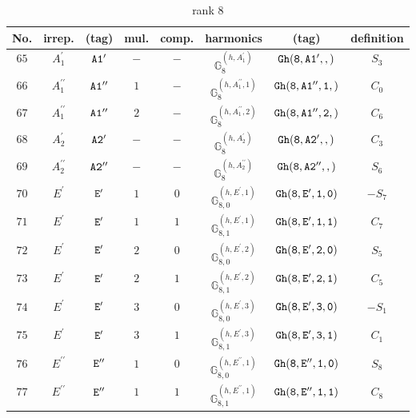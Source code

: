 \documentclass[fleqn,8pt]{jsarticle}
\begin{document}
\begin{table}[ht!]
\begin{center}
\caption{rank 8}
\renewcommand{\arraystretch}{1.3}
\begin{tabular}{cccccccc} \hline \hline
No. & irrep. & (tag) & mul. & comp. & harmonics & (tag) & definition \\ \hline
$ 65 $ & $ A_{1}^{\prime} $ & $ {\tt A1'} $ & $ - $ & $ - $ & $ \mathbb{G}_{8}^{(h,A_{1}^{\prime})} $ & $ {\tt Gh(8,A1',,)} $ & $ S_{3} $ \\
$ 66 $ & $ A_{1}^{\prime\prime} $ & $ {\tt A1''} $ & $ 1 $ & $ - $ & $ \mathbb{G}_{8}^{(h,A_{1}^{\prime\prime},1)} $ & $ {\tt Gh(8,A1'',1,)} $ & $ C_{0} $ \\
$ 67 $ & $ A_{1}^{\prime\prime} $ & $ {\tt A1''} $ & $ 2 $ & $ - $ & $ \mathbb{G}_{8}^{(h,A_{1}^{\prime\prime},2)} $ & $ {\tt Gh(8,A1'',2,)} $ & $ C_{6} $ \\
$ 68 $ & $ A_{2}^{\prime} $ & $ {\tt A2'} $ & $ - $ & $ - $ & $ \mathbb{G}_{8}^{(h,A_{2}^{\prime})} $ & $ {\tt Gh(8,A2',,)} $ & $ C_{3} $ \\
$ 69 $ & $ A_{2}^{\prime\prime} $ & $ {\tt A2''} $ & $ - $ & $ - $ & $ \mathbb{G}_{8}^{(h,A_{2}^{\prime\prime})} $ & $ {\tt Gh(8,A2'',,)} $ & $ S_{6} $ \\
$ 70 $ & $ E^{\prime} $ & $ {\tt E'} $ & $ 1 $ & $ 0 $ & $ \mathbb{G}_{8,0}^{(h,E^{\prime},1)} $ & $ {\tt Gh(8,E',1,0)} $ & $ - S_{7} $ \\
$ 71 $ & $ E^{\prime} $ & $ {\tt E'} $ & $ 1 $ & $ 1 $ & $ \mathbb{G}_{8,1}^{(h,E^{\prime},1)} $ & $ {\tt Gh(8,E',1,1)} $ & $ C_{7} $ \\
$ 72 $ & $ E^{\prime} $ & $ {\tt E'} $ & $ 2 $ & $ 0 $ & $ \mathbb{G}_{8,0}^{(h,E^{\prime},2)} $ & $ {\tt Gh(8,E',2,0)} $ & $ S_{5} $ \\
$ 73 $ & $ E^{\prime} $ & $ {\tt E'} $ & $ 2 $ & $ 1 $ & $ \mathbb{G}_{8,1}^{(h,E^{\prime},2)} $ & $ {\tt Gh(8,E',2,1)} $ & $ C_{5} $ \\
$ 74 $ & $ E^{\prime} $ & $ {\tt E'} $ & $ 3 $ & $ 0 $ & $ \mathbb{G}_{8,0}^{(h,E^{\prime},3)} $ & $ {\tt Gh(8,E',3,0)} $ & $ - S_{1} $ \\
$ 75 $ & $ E^{\prime} $ & $ {\tt E'} $ & $ 3 $ & $ 1 $ & $ \mathbb{G}_{8,1}^{(h,E^{\prime},3)} $ & $ {\tt Gh(8,E',3,1)} $ & $ C_{1} $ \\
$ 76 $ & $ E^{\prime\prime} $ & $ {\tt E''} $ & $ 1 $ & $ 0 $ & $ \mathbb{G}_{8,0}^{(h,E^{\prime\prime},1)} $ & $ {\tt Gh(8,E'',1,0)} $ & $ S_{8} $ \\
$ 77 $ & $ E^{\prime\prime} $ & $ {\tt E''} $ & $ 1 $ & $ 1 $ & $ \mathbb{G}_{8,1}^{(h,E^{\prime\prime},1)} $ & $ {\tt Gh(8,E'',1,1)} $ & $ C_{8} $ \\

\end{tabular}
\end{center}
\end{table}
\end{document}
